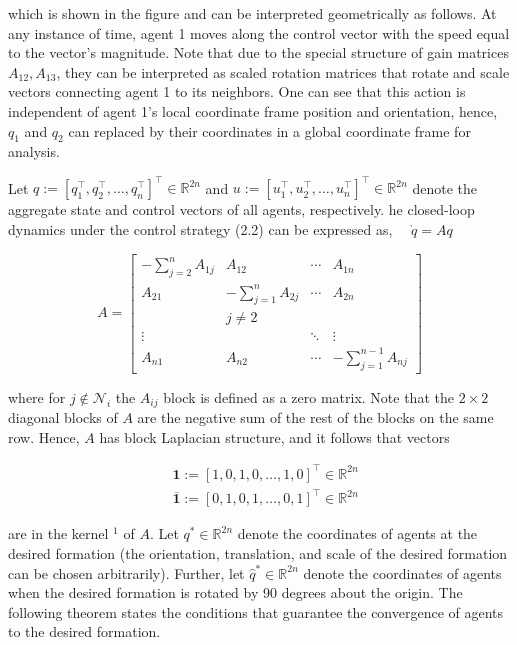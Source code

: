\documentclass[10pt]{article}
\begin{document}
which is shown in the figure and can be interpreted geometrically as follows. At any instance of time, agent 1 moves along the control vector with the speed equal to the vector's magnitude. Note that due to the special structure of gain matrices $A_{12}, A_{13}$, they can be interpreted as scaled rotation matrices that rotate and scale vectors connecting agent 1 to its neighbors. One can see that this action is independent of agent 1's local coordinate frame position and orientation, hence, $q_{1}$ and $q_{2}$ can replaced by their coordinates in a global coordinate frame for analysis.

Let $q:=\left[q_{1}^{\top}, q_{2}^{\top}, \ldots, q_{n}^{\top}\right]^{\top} \in \mathbb{R}^{2 n}$ and $u:=\left[u_{1}^{\top}, u_{2}^{\top}, \ldots, u_{n}^{\top}\right]^{\top} \in \mathbb{R}^{2 n}$ denote the aggregate state and control vectors of all agents, respectively. he closed-loop dynamics under the control strategy (2.2) can be expressed as, $\quad \grave{q}=A q$

$$
A=\left[\begin{array}{cccc}
-\sum_{j=2}^{n} A_{1 j} & A_{12} & \cdots & A_{1 n} \\
A_{21} & -\sum_{j=1}^{n} A_{2 j} & \cdots & A_{2 n} \\
& j \neq 2 & & \\
\vdots & & \ddots & \vdots \\
A_{n 1} & A_{n 2} & \cdots & -\sum_{j=1}^{n-1} A_{n j}
\end{array}\right]
$$

where for $j \notin \mathcal{N}_{i}$ the $A_{i j}$ block is defined as a zero matrix. Note that the $2 \times 2$ diagonal blocks of $A$ are the negative sum of the rest of the blocks on the same row. Hence, $A$ has block Laplacian structure, and it follows that vectors

$$
\begin{aligned}
& \mathbf{1}:=[1,0,1,0, \ldots, 1,0]^{\top} \in \mathbb{R}^{2 n} \\
& \overline{\mathbf{1}}:=[0,1,0,1, \ldots, 0,1]^{\top} \in \mathbb{R}^{2 n}
\end{aligned}
$$

are in the kernel ${ }^{1}$ of $A$. Let $q^{*} \in \mathbb{R}^{2 n}$ denote the coordinates of agents at the desired formation (the orientation, translation, and scale of the desired formation can be chosen arbitrarily). Further, let $\hat{q}^{*} \in \mathbb{R}^{2 n}$ denote the coordinates of agents when the desired formation is rotated by 90 degrees about the origin. The following theorem states the conditions that guarantee the convergence of agents to the desired formation.
\end{document}
